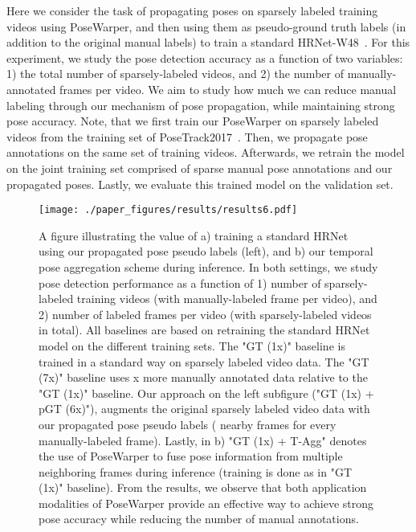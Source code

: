 \documentclass{article}
\begin{document}
Here we consider the task of propagating poses on sparsely labeled training videos using PoseWarper, and then using them as pseudo-ground truth labels (in addition to the original manual labels) to train a standard HRNet-W48~\cite{sun2019deep}. For this experiment, we study the pose detection accuracy as a function of two variables: 1) the total number of sparsely-labeled videos, and 2) the number of manually-annotated frames per video. We aim to study how much we can reduce manual labeling through our mechanism of pose propagation, while maintaining strong pose accuracy. Note, that we first train our PoseWarper on sparsely labeled videos from the training set of PoseTrack2017~\cite{Iqbal_CVPR2017}. Then, we propagate pose annotations on the same set of training videos. Afterwards, we retrain the model on the joint training set comprised of sparse manual pose annotations and our propagated poses. Lastly, we evaluate this trained model on the validation set.


\begin{figure}
\begin{center}
   \texttt{[image: ./paper\_figures/results/results6.pdf]}
\end{center}
\vspace{-0.1cm}
   \caption{A figure illustrating the value of a) training a standard HRNet~\cite{sun2019deep} using our propagated pose pseudo labels (left), and b) our temporal pose aggregation scheme during inference. In both settings, we study pose detection performance as a function of 1) number of sparsely-labeled training videos (with  manually-labeled frame per video), and 2) number of labeled frames per video (with  sparsely-labeled videos in total). All baselines are based on retraining the standard HRNet~\cite{sun2019deep} model on the different training sets. The "GT (1x)" baseline is trained in a standard way on sparsely labeled video data. The "GT (7x)" baseline uses x more manually annotated data relative to the "GT (1x)" baseline. Our approach on the left subfigure ("GT (1x) + pGT (6x)"), augments the original sparsely labeled video data with our propagated pose pseudo labels ( nearby frames for every manually-labeled frame). Lastly, in b) "GT (1x) + T-Agg" denotes the use of PoseWarper to fuse pose information from multiple neighboring frames during inference (training is done as in "GT (1x)" baseline). From the results, we observe that both application modalities of PoseWarper provide an effective way to achieve strong pose accuracy while reducing the number of manual annotations.\vspace{-0.3cm}}\label{results_fig}
\end{figure}
\end{document}
